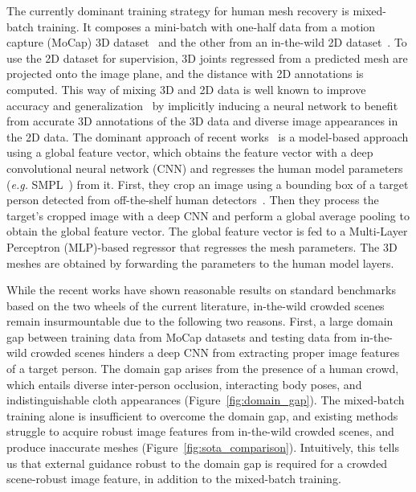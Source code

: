 \documentclass[10pt,twocolumn,letterpaper]{article}
\begin{document}
The currently dominant training strategy for human mesh recovery is mixed-batch training.
It composes a mini-batch with one-half data from a motion capture (MoCap) 3D dataset~\cite{ionescu2014human3,mehta2017monocular} and the other from an in-the-wild 2D dataset~\cite{lin2014mscoco}.
To use the 2D dataset for supervision, 3D joints regressed from a predicted mesh are projected onto the image plane, and the distance with 2D annotations is computed.
This way of mixing 3D and 2D data is well known to improve accuracy and generalization~\cite{kanazawa2018end,kolotouros2019learning} by implicitly inducing a neural network to benefit from accurate 3D annotations of the 3D data and diverse image appearances in the 2D data.
The dominant approach of recent works~\cite{kolotouros2019learning,georgakis2020hierarchical,choi2021beyond} is a model-based approach using a global feature vector, which obtains the feature vector with a deep convolutional neural network (CNN) and regresses the human model parameters (\textit{e.g.} SMPL~\cite{loper2015smpl}) from it.
First, they crop an image using a bounding box of a target person detected from off-the-shelf human detectors~\cite{he2017mask}.
Then they process the target's cropped image with a deep CNN and perform a global average pooling to obtain the global feature vector.
The global feature vector is fed to a Multi-Layer Perceptron (MLP)-based regressor that regresses the mesh parameters.
The 3D meshes are obtained by forwarding the parameters to the human model layers.

While the recent works have shown reasonable results on standard benchmarks~\cite{ionescu2014human3,von20183dpw} based on the two wheels of the current literature, in-the-wild crowded scenes remain insurmountable due to the following two reasons. 
First, a large domain gap between training data from MoCap datasets and testing data from in-the-wild crowded scenes hinders a deep CNN from extracting proper image features of a target person. 
The domain gap arises from the presence of a human crowd, which entails diverse inter-person occlusion, interacting body poses, and indistinguishable cloth appearances (Figure~\ref{fig:domain_gap}).
The mixed-batch training alone is insufficient to overcome the domain gap, and existing methods struggle to acquire robust image features from in-the-wild crowded scenes, and produce inaccurate meshes (Figure~\ref{fig:sota_comparison}).
Intuitively, this tells us that external guidance robust to the domain gap is required for a crowded scene-robust image feature, in addition to the mixed-batch training.
\end{document}
